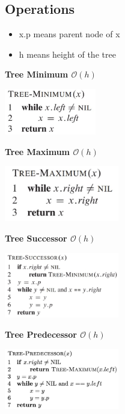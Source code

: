 \documentclass[10pt,a4paper,twocolumn]{article}
\begin{document}
\subsection{Operations}
\begin{itemize}
	\item x.p means parent node of x
	\item h means height of the tree
\end{itemize}


\textbf{Tree Minimum $\mathcal{O}(h)$}
\begin{center}
	\includegraphics[width=4cm]{images/tree-minimum}
\end{center}

\textbf{Tree Maximum $\mathcal{O}(h)$}
\begin{center}
	\includegraphics[width=5cm]{images/tree-maximum}
\end{center}

\textbf{Tree Successor $\mathcal{O}(h)$}
\begin{center}
	\includegraphics[width=5cm]{images/tree-successor}
\end{center}

\textbf{Tree Predecessor $\mathcal{O}(h)$}
\begin{center}
	\includegraphics[width=5cm]{images/tree-predecessor}
\end{center}
\end{document}
